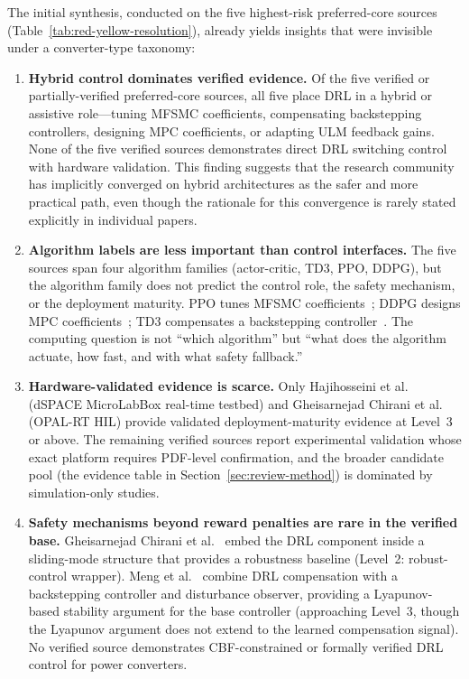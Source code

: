 \documentclass[manuscript,screen,review]{acmart}
\begin{document}
The initial synthesis, conducted on the five highest-risk preferred-core sources (Table~\ref{tab:red-yellow-resolution}), already yields insights that were invisible under a converter-type taxonomy:

\begin{enumerate}
  \item \textbf{Hybrid control dominates verified evidence.}
  Of the five verified or partially-verified preferred-core sources, all five place DRL in a hybrid or assistive role---tuning MFSMC coefficients, compensating backstepping controllers, designing MPC coefficients, or adapting ULM feedback gains.
  None of the five verified sources demonstrates direct DRL switching control with hardware validation.
  This finding suggests that the research community has implicitly converged on hybrid architectures as the safer and more practical path, even though the rationale for this convergence is rarely stated explicitly in individual papers.

  \item \textbf{Algorithm labels are less important than control interfaces.}
  The five sources span four algorithm families (actor-critic, TD3, PPO, DDPG), but the algorithm family does not predict the control role, the safety mechanism, or the deployment maturity.
  PPO tunes MFSMC coefficients~\cite{gheisarnejad2022reducing}; DDPG designs MPC coefficients~\cite{khooban2022smartenance}; TD3 compensates a backstepping controller~\cite{meng2022novel}.
  The computing question is not ``which algorithm'' but ``what does the algorithm actuate, how fast, and with what safety fallback.''

  \item \textbf{Hardware-validated evidence is scarce.}
  Only Hajihosseini et al.~\cite{hajihosseini2020dc} (dSPACE MicroLabBox real-time testbed) and Gheisarnejad Chirani et al.~\cite{gheisarnejad2022reducing} (OPAL-RT HIL) provide validated deployment-maturity evidence at Level~3 or above.
  The remaining verified sources report experimental validation whose exact platform requires PDF-level confirmation, and the broader candidate pool (the evidence table in Section~\ref{sec:review-method}) is dominated by simulation-only studies.

  \item \textbf{Safety mechanisms beyond reward penalties are rare in the verified base.}
  Gheisarnejad Chirani et al.~\cite{gheisarnejad2022reducing} embed the DRL component inside a sliding-mode structure that provides a robustness baseline (Level~2: robust-control wrapper).
  Meng et al.~\cite{meng2022novel} combine DRL compensation with a backstepping controller and disturbance observer, providing a Lyapunov-based stability argument for the base controller (approaching Level~3, though the Lyapunov argument does not extend to the learned compensation signal).
  No verified source demonstrates CBF-constrained or formally verified DRL control for power converters.
\end{enumerate}
\end{document}
